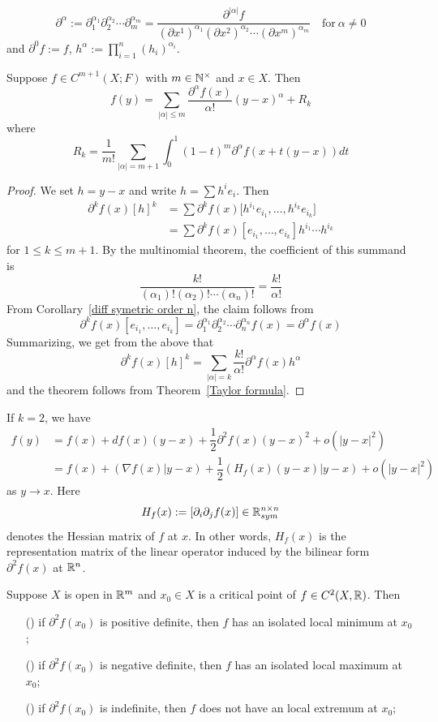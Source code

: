 \[\partial^{\alpha}:=\partial_1^{\alpha_1}\partial_2^{\alpha_2}\cdots\partial_m^{\alpha_m}=\dfrac{\partial^{|\alpha|}f}{(\partial x^1)^{\alpha_1}(\partial x^2)^{\alpha_2}\cdots(\partial x^m)^{\alpha_m}}\quad\text{for}\ \alpha\neq 0\]
and $\partial^0f:=f$, $h^\alpha:=\prod_{i=1}^{n}(h_i)^{\alpha_i}$.
\begin{theorem}
Suppose $f\in C^{m+1}(X;F)$ with $m\in\mathbb{N}^{\times}$ and $x\in X$. Then
\[f(y)=\sum_{|\alpha|\leq m}\dfrac{\partial^{\alpha}f(x)}{\alpha!}(y-x)^\alpha+R_k\]
where
\[R_k=\frac{1}{m!}\sum_{|\alpha|=m+1}\int_{0}^{1}(1-t)^{m}\partial^\alpha f(x+t(y-x))dt\]
\end{theorem}
\begin{proof}
We set $h=y-x$ and write $h=\sum h^ie_i$. Then
\begin{align*}
\partial^kf(x)[h]^k&=\sum\partial^kf(x)\big[h^{i_1}e_{i_1},\dots,h^{i_k}e_{i_k}\big]\\
&=\sum\partial^kf(x)[e_{i_1},\dots,e_{i_k}]h^{i_1}\cdots h^{i_k}
\end{align*}
for $1\leq k\leq m+1$. By the multinomial theorem, the coefficient of this summand is
\[\dfrac{k!}{(\alpha_1)!(\alpha_2)!\cdots(\alpha_n)!}=\dfrac{k!}{\alpha!}\]
From Corollary~\ref{diff symetric order n}, the claim follows from
\[\partial^kf(x)[e_{i_1},\dots,e_{i_k}]=\partial_1^{\alpha_1}\partial_2^{\alpha_2}\cdots\partial_n^{\alpha_n}f(x)=\partial^{\alpha}f(x)\]
Summarizing, we get from the above that
\[\partial^kf(x)[h]^k=\sum_{|\alpha|=k}\dfrac{k!}{\alpha!}\partial^\alpha f(x)h^\alpha\]
and the theorem follows from Theorem~\ref{Taylor formula}.
\end{proof}
\begin{example}
If $k=2$, we have
\begin{align*}
f(y)&=f(x)+df(x)(y-x)+\dfrac{1}{2}\partial^2f(x)(y-x)^2+o(|y-x|^2)\\
&=f(x)+(\nabla f(x)|y-x)+\dfrac{1}{2}(H_f(x)(y-x)|y-x)+o(|y-x|^2)
\end{align*}
as $y\to x$. Here 
\[H_f(x):=[\partial_i\partial_jf(x)]\in\mathbb{R}^{n\times n}_{sym}\]
denotes the Hessian matrix of $f$ at $x$. In other words, $H_f(x)$ is the representation matrix of the linear operator induced by the bilinear form $\partial^2f(x)$ at $\mathbb{R}^n$.
\end{example}
\begin{theorem}
Suppose $X$ is open in $\mathbb{R}^m$ and $x_0\in X$ is a critical point of
$f\in C^2(X,\mathbb{R})$. Then
\begin{itemize}
\item[(\rmnum{1})]if $\partial^2f(x_0)$ is positive definite, then $f$ has an isolated local minimum at $x_0$;
\item[(\rmnum{1})]if $\partial^2f(x_0)$ is negative definite, then $f$ has an isolated local maximum at $x_0$;
\item[(\rmnum{1})]if $\partial^2f(x_0)$ is indefinite, then $f$ does not have an local extremum at $x_0$;
\end{itemize}
\end{theorem}
